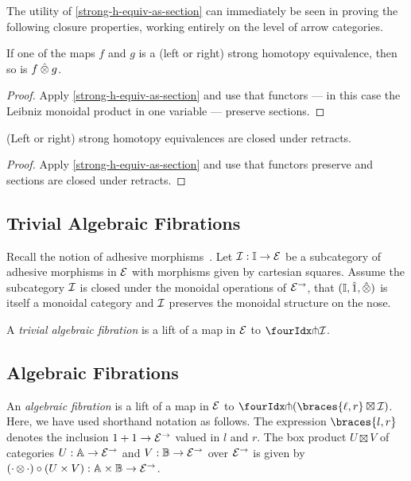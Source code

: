 \documentclass[reqno,10pt,a4paper,oneside]{amsart}
\begin{document}
The utility of \cref{strong-h-equiv-as-section} can immediately be seen in proving the following closure properties, working entirely on the level of arrow categories.

\begin{proposition}
\label{strong-h-equiv-closed-under-monoidal-prod}
If one of the maps $f$ and $g$ is a (left or right) strong homotopy equivalence, then so is $f \hatotimes g$.
\end{proposition}

\begin{proof}
Apply \cref{strong-h-equiv-as-section} and use that functors --- in this case the Leibniz monoidal product in one variable --- preserve sections.
\end{proof}

\begin{proposition}
\label{strong-h-equiv-closed-under-retract}
(Left or right) strong homotopy equivalences are closed under retracts.
\end{proposition}

\begin{proof}
Apply \cref{strong-h-equiv-as-section} and use that functors preserve and sections are closed under retracts.
\end{proof}

\subsection{Trivial Algebraic Fibrations}

Recall the notion of adhesive morphisms~\cite{garner-lack:adhesive}.
Let $\cal{I} : \cat{I} \to \catE$ be a subcategory of adhesive morphisms in $\catE$ with morphisms given by cartesian squares.
Assume the subcategory $\cal{I}$ is closed under the monoidal operations of $\catE^{\to}$, \ie that $(\cat{I}, \hatunit, \hatotimes)$ is itself a monoidal category and $\cal{I}$ preserves the monoidal structure on the nose.

A \emph{trivial algebraic fibration} is a lift of a map in $\catE$ to $\liftr{\cal{I}}$.

\subsection{Algebraic Fibrations}

An \emph{algebraic fibration} is a lift of a map in $\catE$ to $\liftr{(\braces{\intervall, \intervalr} \boxtimes \cal{I})}$.
Here, we have used shorthand notation as follows.
The expression $\braces{l, r}$ denotes the inclusion $1 + 1 \to \catE^{\to}$ valued in $l$ and $r$.
The box product $U \boxtimes V$ of categories $U : \cat{A} \to \catE^{\to}$ and $V : \cat{B} \to \catE^{\to}$ over $\catE^{\to}$ is given by $(\arghole \otimes \arghole) \cc (U \times V) : \cat{A} \times \cat{B} \to \catE^{\to}$.
\end{document}
